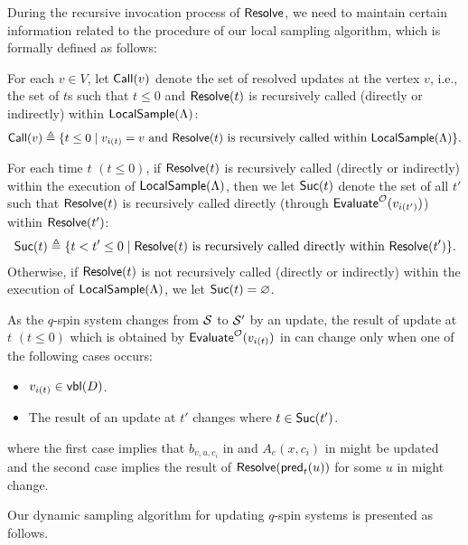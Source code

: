 During the recursive invocation process of $\textnormal{\textsf{Resolve}}$, we need to maintain certain information related to the procedure of our local sampling algorithm, which is formally defined as follows:

\begin{definition}\label{def:call}
For each $v\in V$, let $\textnormal{\textsf{Call}}(v)$ denote the set of resolved updates at the vertex $v$, i.e., the set of $t$s such that $t\leq 0$ and $\textnormal{\textsf{Resolve}}(t)$ is recursively called (directly or indirectly) within $\textnormal{\textsf{LocalSample}}(\Lambda)$:
\begin{align}
\textnormal{\textsf{Call}}(v) \triangleq \{t\leq 0 \mid v_{i(t)} = v \text{ and $\textnormal{\textsf{Resolve}}(t)$ is recursively called within $\textnormal{\textsf{LocalSample}}(\Lambda)$} \}. 
\end{align}
\end{definition}
\begin{definition}\label{def:seccessor}
For each time $t$ $(t\leq 0)$, if $\textnormal{\textsf{Resolve}}(t)$ is recursively called (directly or indirectly) within the execution of $\textnormal{\textsf{LocalSample}}(\Lambda)$, then we let $\textnormal{\textsf{Suc}}(t)$ denote the set of all $t'$ such that $\textnormal{\textsf{Resolve}}(t)$ is recursively called directly (through $\textnormal{\textsf{Evaluate}}^{\mathcal{O}}(v_{i(t')})$) within $\textnormal{\textsf{Resolve}}(t')$:
\begin{align}
\textnormal{\textsf{Suc}}(t) \triangleq \{t < t'\leq 0 \mid \textnormal{\textsf{Resolve}}(t) \text{ is recursively called directly within } \textnormal{\textsf{Resolve}}(t') \}. 
\end{align}
Otherwise, if $\textnormal{\textsf{Resolve}}(t)$ is not recursively called (directly or indirectly) within the execution of $\textnormal{\textsf{LocalSample}}(\Lambda)$, we let $\textnormal{\textsf{Suc}}(t)=\varnothing$.
\end{definition}

As the $q$-spin system changes from $\mathcal{S}$ to $\mathcal{S}'$ by an update,
the result of update at $t$ $(t\leq 0)$ which is obtained by $\textnormal{\textsf{Evaluate}}^{\mathcal{O}}(v_{i(t)})$ in 
can change only when one of the following cases occurs:
\begin{itemize}
    \item $v_{i(t)} \in \textnormal{\textsf{vbl}}(D)$.
    \item The result of an update at $t'$ changes where $t\in \textnormal{\textsf{Suc}}(t')$.
\end{itemize}
where the first case implies that $b_{v,u,c_i}$ in  and $A_e(x,c_i)$ in  might be updated and the second case implies the result of $\textnormal{\textsf{Resolve}}(\textnormal{\textsf{pred}}_t(u))$ for some $u$ in  might change.

Our dynamic sampling algorithm for updating $q$-spin systems is presented as follows.

